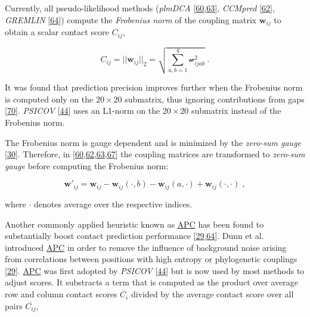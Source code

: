 \documentclass[12pt,a4paper,twoside]{book}
\newcommand{\w}{\mathbf{w}}
\newcommand{\wij}{\mathbf{w}_{ij}}
\newcommand{\wijab}{\mathcal{w}_{ijab}}
\theoremstyle{definition}
\theoremstyle{definition}
\theoremstyle{remark}
\begin{document}
Currently, all pseudo-likelihood methods (\emph{plmDCA}
{[}\protect\hyperlink{ref-Ekeberg2013}{60},\protect\hyperlink{ref-Ekeberg2014}{63}{]},
\emph{CCMpred} {[}\protect\hyperlink{ref-Seemayer2014}{62}{]},
\emph{GREMLIN} {[}\protect\hyperlink{ref-Kamisetty2013}{64}{]}) compute
the \emph{Frobenius norm} of the coupling matrix \(\wij\) to obtain a
scalar contact score \(C_{ij}\),

\begin{equation}
    C_{ij}  = ||\wij||_2 = \sqrt{\sum_{a,b=1}^q \wijab^2} \; .
\label{eq:frobenius-norm}
\end{equation}

It was found that prediction precision improves further when the
Frobenius norm is computed only on the \(20 \times 20\) submatrix, thus
ignoring contributions from gaps
{[}\protect\hyperlink{ref-Feinauer2014}{70}{]}. \emph{PSICOV}
{[}\protect\hyperlink{ref-Jones2012}{44}{]} uses an L1-norm on the
\(20 \times 20\) submatrix instead of the Frobenius norm.

The Frobenius norm is gauge dependent and is minimized by the
\emph{zero-sum gauge} {[}\protect\hyperlink{ref-Weigt2009}{30}{]}.
Therefore, in
{[}\protect\hyperlink{ref-Ekeberg2013}{60},\protect\hyperlink{ref-Seemayer2014}{62},\protect\hyperlink{ref-Ekeberg2014}{63},\protect\hyperlink{ref-Baldassi2014}{67}{]}
the coupling matrices are transformed to \emph{zero-sum gauge} before
computing the Frobenius norm:

\begin{equation}
    \w\prime_{ij}  = \wij - \wij(\cdot, b) - \wij(a, \cdot) + \wij(\cdot, \cdot) \; ,
\label{eq:zero-sum-gauge-transform}
\end{equation}

where \(\cdot\) denotes average over the respective indices.

Another commonly applied heuristic known as
\protect\hyperlink{abbrev}{APC} has been found to substantially boost
contact prediction performance
{[}\protect\hyperlink{ref-Dunn2008}{29},\protect\hyperlink{ref-Kamisetty2013}{64}{]}.
Dunn et al. introduced \protect\hyperlink{abbrev}{APC} in order to
remove the influence of background noise arising from correlations
between positions with high entropy or phylogenetic couplings
{[}\protect\hyperlink{ref-Dunn2008}{29}{]}.
\protect\hyperlink{abbrev}{APC} was first adopted by \emph{PSICOV}
{[}\protect\hyperlink{ref-Jones2012}{44}{]} but is now used by most
methods to adjust scores. It substracts a term that is computed as the
product over average row and column contact scores \(\overline{C_i}\)
divided by the average contact score over all pairs
\(\overline{C_{ij}}\),
\end{document}
